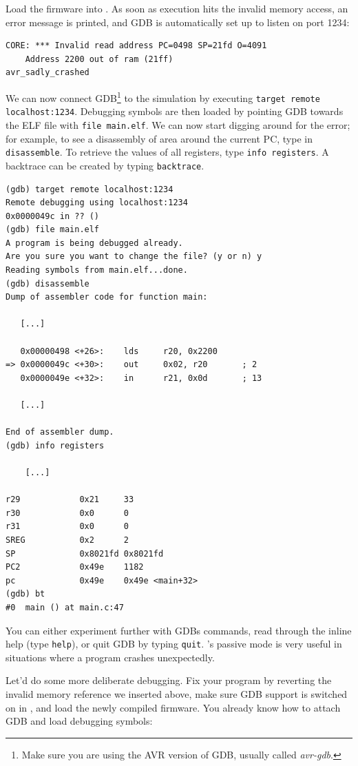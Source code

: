 Load the firmware into \qsimavr. As soon as execution hits the invalid memory
access, an error message is printed, and \ac{GDB} is automatically set up to listen
on port 1234:

\begin{verbatim}
CORE: *** Invalid read address PC=0498 SP=21fd O=4091
    Address 2200 out of ram (21ff)
avr_sadly_crashed
\end{verbatim}

We can now connect \ac{GDB}\footnote{
%
Make sure you are using the \ac{AVR} version of \ac{GDB}, usually called \emph{avr-gdb}.
%
} to the simulation by executing \verb|target remote localhost:1234|. Debugging symbols
are then loaded by pointing \ac{GDB} towards the \ac{ELF} file with \verb|file main.elf|.
We can now start digging around for the error; for example, to see a disassembly
of area around the current \ac{PC}, type in \verb|disassemble|. To retrieve the
values of all registers, type \verb|info registers|. A backtrace can be created
by typing \verb|backtrace|.

\begin{verbatim}
(gdb) target remote localhost:1234
Remote debugging using localhost:1234
0x0000049c in ?? ()
(gdb) file main.elf
A program is being debugged already.
Are you sure you want to change the file? (y or n) y
Reading symbols from main.elf...done.
(gdb) disassemble
Dump of assembler code for function main:

   [...]

   0x00000498 <+26>:    lds     r20, 0x2200
=> 0x0000049c <+30>:    out     0x02, r20       ; 2
   0x0000049e <+32>:    in      r21, 0x0d       ; 13

   [...]

End of assembler dump.
(gdb) info registers

    [...]

r29            0x21     33
r30            0x0      0
r31            0x0      0
SREG           0x2      2
SP             0x8021fd 0x8021fd
PC2            0x49e    1182
pc             0x49e    0x49e <main+32>
(gdb) bt
#0  main () at main.c:47
\end{verbatim}

You can either experiment further with \acp{GDB} commands, read through the
inline help (type \verb|help|), or quit \ac{GDB} by typing \verb|quit|.
\simavr's passive mode is very useful in situations where a program crashes
unexpectedly.

Let'd do some more deliberate debugging. Fix your program by reverting the
invalid memory reference we inserted above, make sure \ac{GDB} support is
switched on in \qsimavr, and load the newly compiled firmware. You already know
how to attach \ac{GDB} and load debugging symbols:

